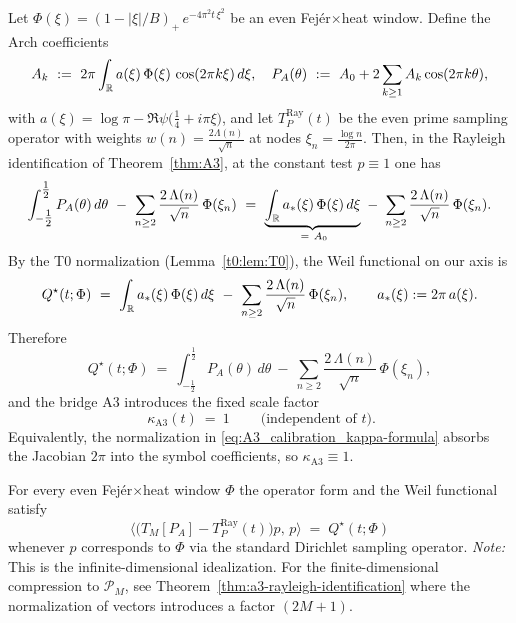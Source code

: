 \begin{lemma}\label{a3:lem:A3-kappa}
Let $\Phi(\xi)=(1-|\xi|/B)_+\,e^{-4\pi^2 t\,\xi^2}$ be an even Fej\'er$\times$heat window. Define the Arch coefficients
\begin{equation}\label{eq:A3_calibration_kappa-formula}
  A_k\ :=\ 2\pi\int_{\mathbb R} a(\xi)\,\Phi(\xi)\,\cos(2\pi k\xi)\,d\xi,\quad
  P_A(\theta)\ :=\ A_0+2\sum_{k\ge1}A_k\cos(2\pi k\theta),
\end{equation}
with $a(\xi)=\log\pi-\Re\psi\big(\tfrac14+i\pi\xi\big)$, and let $T_P^{\mathrm{Ray}}(t)$ be the even prime sampling operator with weights $w(n)=\tfrac{2\Lambda(n)}{\sqrt n}$ at nodes $\xi_n=\tfrac{\log n}{2\pi}$. Then, in the Rayleigh identification of Theorem~\ref{thm:A3}, at the constant test $p\equiv1$ one has
\begin{equation}\label{eq:A3_calibration_kappa-formula-3}
  \int_{-\tfrac12}^{\tfrac12} P_A(\theta)\,d\theta\ -\ \sum_{n\ge2}\frac{2\,\Lambda(n)}{\sqrt n}\,\Phi(\xi_n)
  \ =\ \underbrace{\int_{\RR} a_*(\xi)\,\Phi(\xi)\,d\xi}_{\;=\ A_0}\ -\ \sum_{n\ge2}\frac{2\,\Lambda(n)}{\sqrt n}\,\Phi(\xi_n).
\end{equation}
By the T0 normalization (Lemma~\ref{t0:lem:T0}), the Weil functional on our axis is
\begin{equation}\label{eq:A3_calibration_kappa-q-functional-1}
  Q^\star(t;\Phi)\ =\ \int_{\RR} a_*(\xi)\,\Phi(\xi)\,d\xi\ -\ \sum_{n\ge2}\frac{2\,\Lambda(n)}{\sqrt n}\,\Phi(\xi_n),\qquad a_*(\xi):=2\pi\,a(\xi).
\end{equation}
Therefore
\begin{equation}\label{eq:A3_calibration_kappa-q-functional}
  Q^\star(t;\Phi)\ =\ \int_{-\tfrac12}^{\tfrac12} P_A(\theta)\,d\theta\ -\ \sum_{n\ge2}\frac{2\,\Lambda(n)}{\sqrt n}\,\Phi(\xi_n),
\end{equation}
and the bridge A3 introduces the fixed scale factor
\begin{equation}\label{eq:A3_calibration_kappa-formula-2}
\boxed{\ \kappa_{\mathrm{A3}}(t)\ =\ 1\ }\qquad\text{(independent of $t$)}.
\end{equation}
Equivalently, the normalization in \eqref{eq:A3_calibration_kappa-formula} absorbs the Jacobian $2\pi$ into the symbol coefficients, so $\kappa_{\mathrm{A3}}\equiv1$.
\end{lemma}
\label{a3:lem:rayleigh_sampling_id}

\begin{lemma}\label{lem:rayleigh-sampling}
For every even Fej\'er$\times$heat window $\Phi$ the operator form and the Weil functional satisfy
\[
  \Big\langle \bigl(T_M[P_A]-T_P^{\mathrm{Ray}}(t)\bigr) p,\,p\Big\rangle \;=\; Q^\star(t;\Phi)
\]
whenever $p$ corresponds to $\Phi$ via the standard Dirichlet sampling operator.
\emph{Note:} This is the infinite-dimensional idealization.  For the finite-dimensional
compression to $\mathcal P_M$, see Theorem~\ref{thm:a3-rayleigh-identification} where
the normalization of vectors introduces a factor $(2M{+}1)$.
\end{lemma}

